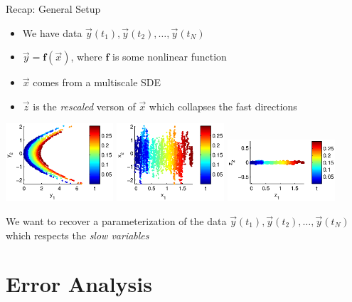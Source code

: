 \documentclass[12pt]{beamer}
\begin{document}
\begin{frame}{Recap: General Setup}


\begin{itemize}

\item We have data $\vec{y}(t_1), \vec{y}(t_2), \dots, \vec{y}(t_N)$


\item $\vec{y} = \mathbf{f}(\vec{x})$, where $\mathbf{f}$ is some nonlinear function


\item $\vec{x}$ comes from a multiscale SDE


\item $\vec{z}$ is the {\em rescaled} verson of $\vec{x}$ which collapses the fast directions



\end{itemize}


\includegraphics[width=0.3\textwidth]{data_init_nonlinear}
\hfill
\includegraphics[width=0.3\textwidth]{data_init}
\hfill
\includegraphics[width=0.3\textwidth]{data_rescaled}

We want to recover a parameterization of the data $\vec{y}(t_1), \vec{y}(t_2), \dots, \vec{y}(t_N)$ which respects the {\em slow variables}

\end{frame}

\section{Error Analysis}
\end{document}
